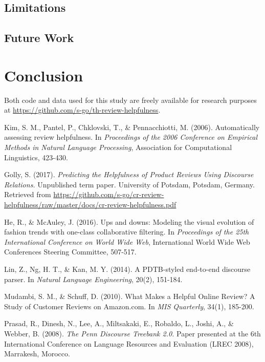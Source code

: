 \documentclass[
    a4paper,%
    12pt,%
    oneside,%
    toc=bibliography,
    final,
]{scrartcl}
\begin{document}
\subsection{Limitations}



\subsection{Future Work}



\section{Conclusion}
\label{sec:conclusion}



\vfill


\begin{center}
Both code and data used for this study are freely available for research purposes at \url{https://github.com/s-go/th-review-helpfulness}.
\end{center}

\newpage
\begin{thebibliography}{9}

 Kim, S. M., Pantel, P., Chklovski, T., \& Pennacchiotti, M. (2006). Automatically assessing review helpfulness. In \textit{Proceedings of the 2006 Conference on Empirical Methods in Natural Language Processing}, Association for Computational Linguistics, 423-430.

 Golly, S. (2017). \textit{Predicting the Helpfulness of Product Reviews Using Discourse Relations.} Unpublished term paper. University of Potsdam, Potsdam, Germany. Retrieved from \url{https://github.com/s-go/cr-review-helpfulness/raw/master/docs/cr-review-helpfulness.pdf}

 He, R., \& McAuley, J. (2016). Ups and downs: Modeling the visual evolution of fashion trends with one-class collaborative filtering. In \textit{Proceedings of the 25th International Conference on World Wide Web}, International World Wide Web Conferences Steering Committee, 507-517.

 Lin, Z., Ng, H. T., \& Kan, M. Y. (2014). A PDTB-styled end-to-end discourse parser. In \textit{Natural Language Engineering}, 20(2), 151-184.

 Mudambi, S. M., \& Schuff, D. (2010). What Makes a Helpful Online Review? A Study of Customer Reviews on Amazon.com. In \textit{MIS Quarterly}, 34(1), 185-200.

Prasad, R., Dinesh, N., Lee, A., Miltsakaki, E., Robaldo, L., Joshi, A., \& Webber, B. (2008). \textit{The Penn Discourse Treebank 2.0.} Paper presented at the 6th International Conference on Language Resources and Evaluation (LREC 2008), Marrakesh, Morocco.

\end{thebibliography}
\end{document}
